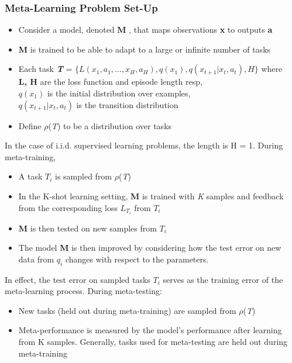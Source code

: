 \subsubsection{Meta-Learning Problem Set-Up}
\begin{itemize}
\setlength\itemsep{0.1em}
  \item Consider a model, denoted \textbf{M} , that maps observations \textbf{x} to outputs \textbf{a}
  \item \textbf{M} is trained to be able to adapt to a large or infinite number of tasks
  \item Each task  \textbf{\textit{T}} = $ \{L(x_1 , a_1, \ldots , x_H , a_H ), q(x_1), q(x_{t+1}|x_t , a_t ), H\} $ where\\ 
           \tab \textbf{L, H} are the loss function and episode length resp,\\          
           \tab $ q(x_1) $ is the initial distribution over examples,\\
           \tab $ q(x_{t+1}|x_t , a_t) $ is the transition distribution\\      
  \item Define $\rho$(\textit{T}) to be a distribution over tasks
\end{itemize}
In the case of i.i.d. supervised learning problems, the length is H = 1.\newline
During meta-training, 
\begin{itemize}
\setlength\itemsep{0.1em}
  \item A task $\textit{T}_i$ is sampled from $\rho$(\textit{T})
  \item In the K-shot learning setting, \textbf{M} is trained with \textit{K} samples and feedback from the corresponding loss $L_{T_i}$ from $\textit{T}_i$
  \item \textbf{M} is then tested on new samples from $\textit{T}_i$ 
  \item The model \textbf{M} is then improved by considering how
the test error on new data from $q_i$ changes with respect to
the parameters.
\end{itemize}
In effect, the test error on sampled tasks $T_i$ serves as the training error of the meta-learning process.\newline
During meta-testing:
\begin{itemize}
\setlength\itemsep{0.1em}
\item New tasks (held out during meta-training) are sampled from $\rho$(\textit{T})
\item Meta-performance is measured by the model's performance after learning from K samples. Generally, tasks used for meta-testing are held out during meta-training
\end{itemize}

